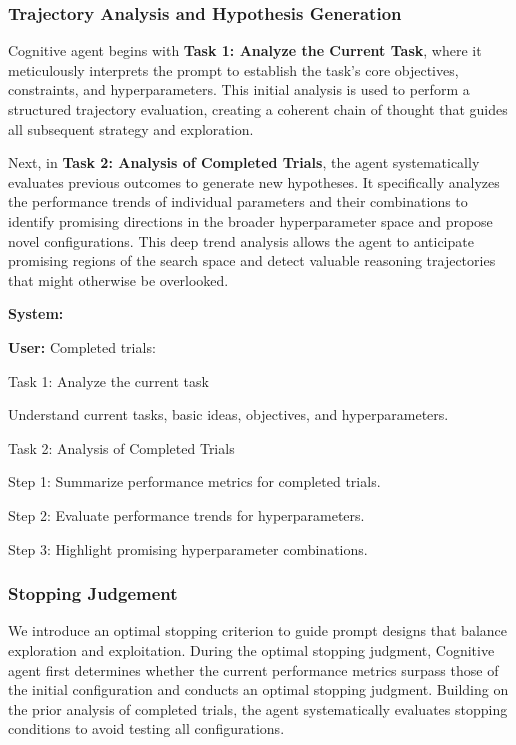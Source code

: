 \subsubsection{Trajectory Analysis and Hypothesis Generation}
Cognitive agent begins with \textbf{Task 1: Analyze the Current Task}, where it meticulously interprets the prompt to establish the task's core objectives, constraints, and hyperparameters. This initial analysis is used to perform a structured trajectory evaluation, creating a coherent chain of thought that guides all subsequent strategy and exploration.

Next, in \textbf{Task 2: Analysis of Completed Trials}, the agent systematically evaluates previous outcomes to generate new hypotheses. It specifically analyzes the performance trends of individual parameters and their combinations to identify promising directions in the broader hyperparameter space and propose novel configurations. This deep trend analysis allows the agent to anticipate promising regions of the search space and detect valuable reasoning trajectories that might otherwise be overlooked.

\begin{tcolorbox}[breakable, colback=orange!5!white, colframe=black, title={Cognitive Prompt for Trajectory Analysis and Hypothesis Generation}]
\textbf{System:} 




\textbf{User:}
Completed trials:


Task 1: Analyze the current task

Understand current tasks, basic ideas, objectives, and hyperparameters.

Task 2: Analysis of Completed Trials

Step 1: Summarize performance metrics for completed trials.

Step 2: Evaluate performance trends for hyperparameters.

Step 3: Highlight promising hyperparameter combinations.
\end{tcolorbox}

\subsubsection{Stopping Judgement}
\label{sec:supp_stop_criterion}
We introduce an optimal stopping criterion to guide prompt designs that balance exploration and exploitation. During the optimal stopping judgment, Cognitive agent first determines whether the current performance metrics surpass those of the initial configuration and conducts an optimal stopping judgment. Building on the prior analysis of completed trials, the agent systematically evaluates stopping conditions to avoid testing all configurations. 

